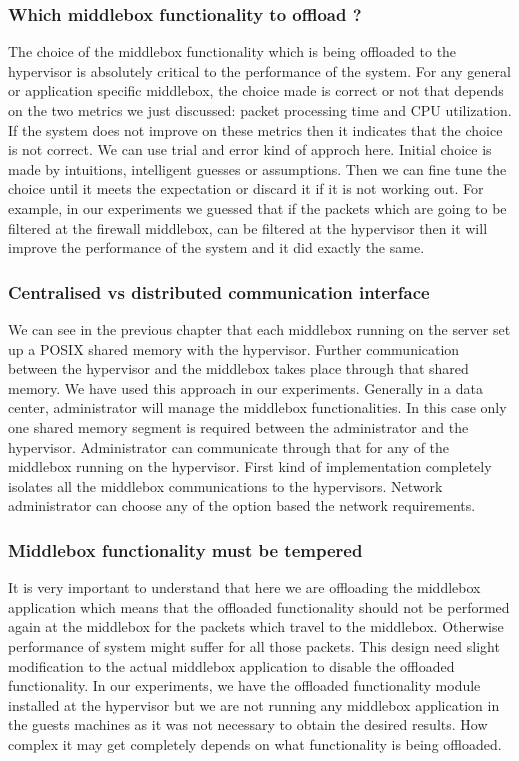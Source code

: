 \documentclass[a4paper,11pt]{report}
\begin{document}
\subsubsection{Which middlebox functionality to offload ?}
The choice of the middlebox functionality which is being offloaded to the hypervisor is absolutely critical to the performance of the system. For any general or application specific middlebox, the choice made is correct or not that depends on the two metrics we just discussed: packet processing time and CPU utilization. If the system does not improve on these metrics then it indicates that the choice is not correct. We can use trial and error kind of approch here. Initial choice is made by intuitions, intelligent guesses or assumptions. Then we can fine tune the choice until it meets the expectation or discard it if it is not working out. For example, in our experiments we guessed that if the packets which are going to be filtered at the firewall middlebox, can be filtered at the hypervisor then it will improve the performance of the system and it did exactly the same.          
\subsubsection{Centralised vs distributed communication interface}
We can see in the previous chapter that each middlebox running on the server set up a POSIX shared memory with the hypervisor. Further communication between the hypervisor and the middlebox takes place through that shared memory. We have used this approach in our experiments. Generally in a data center, administrator will manage the middlebox functionalities. In this case only one shared memory segment is required between the administrator and the hypervisor. Administrator can communicate through that for any of the middlebox running on the hypervisor. First kind of implementation completely isolates all the middlebox communications to the hypervisors. Network administrator can choose any of the option based the network requirements.    
\subsubsection{Middlebox functionality must be tempered}
It is very important to understand that here we are offloading the middlebox application which means that the offloaded functionality should not be performed again at the middlebox for the packets which travel to the middlebox. Otherwise performance of system might suffer for all those packets. This design need slight modification to the actual middlebox application to disable the offloaded functionality. In our experiments, we have the offloaded functionality module installed at the hypervisor but we are not running any middlebox application in the guests machines as it was not necessary to obtain the desired results. How complex it may get completely depends on what functionality is being offloaded. 
\end{document}
